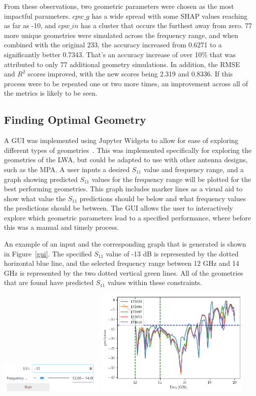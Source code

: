 \documentclass[conference]{IEEEtran}
\newenvironment{Figure}
    {\par\medskip\noindent\minipage{\linewidth}}
    {\endminipage\par\medskip}
\begin{document}
From these observations, two geometric parameters were chosen as the most impactful parameters. $cpw\_g$ has a wide spread with some SHAP values reaching as far as -10, and $cpw\_in$ has a cluster that occurs the furthest away from zero. 77 more unique geometries were simulated across the frequency range, and when combined with the original 233, the accuracy increased from 0.6271 to a significantly better 0.7343. That's an accuracy increase of over 10\% that was attributed to only 77 additional geometry simulations. In addition, the RMSE and $R^2$ scores improved, with the new scores being 2.319 and 0.8336. If this process were to be repeated one or two more times, an improvement across all of the metrics is likely to be seen. 


\subsection{Finding Optimal Geometry}
A GUI was implemented using Jupyter Widgets to allow for ease of exploring different types of geometries~\cite{interactive_Jupyter_widgets}. This was implemented specifically for exploring the geometries of the LWA, but could be adapted to use with other antenna designs, such as the MPA. A user inputs a desired $S_{11}$ value and frequency range, and a graph showing predicted $S_{11}$ values for the frequency range will be plotted for the best performing geometries. This graph includes marker lines as a visual aid to show what value the $S_{11}$ predictions should be below and what frequency values the predictions should be between. The GUI allows the user to interactively explore which geometric parameters lead to a specified performance, where before this was a manual and timely process. 

An example of an input and the corresponding graph that is generated is shown in Figure~\ref{gui}. The specified $S_{11}$ value of -13 dB is represented by the dotted horizontal blue line, and the selected frequency range between 12 GHz and 14 GHz is represented by the two dotted vertical green lines. All of the geometries that are found have predicted $S_{11}$ values within these constraints.  

\begin{Figure}
    \centering
    \includegraphics[width=2in]{gui_input}
    \includegraphics[width=3in]{gui_graph}
    \label{gui}
\end{Figure}
\end{document}
